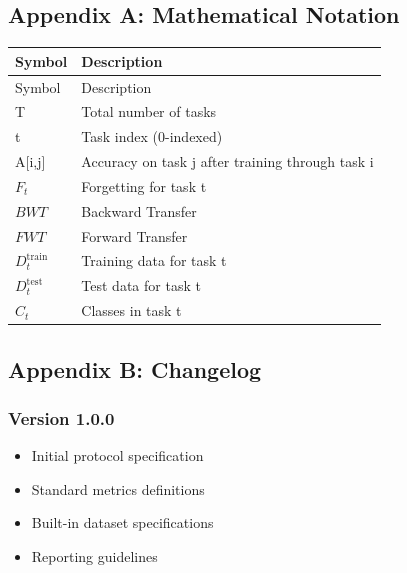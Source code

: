 \documentclass[11pt]{article}
\begin{document}
\subsection{Appendix A: Mathematical Notation}

\begin{longtable}{p{} p{}}
\toprule
Symbol & Description \\
\midrule
\endfirsthead
\toprule
Symbol & Description \\
\midrule
\endhead
T & Total number of tasks \\
t & Task index (0-indexed) \\
A[i,j] & Accuracy on task j after training through task i \\
$F_t$ & Forgetting for task t \\
$BWT$ & Backward Transfer \\
$FWT$ & Forward Transfer \\
$D_t^{\mathrm{train}}$ & Training data for task t \\
$D_t^{\mathrm{test}}$ & Test data for task t \\
$C_t$ & Classes in task t \\
\bottomrule
\end{longtable}

\subsection{Appendix B: Changelog}

\subsubsection{Version 1.0.0}

\begin{itemize}[leftmargin=*]
\item Initial protocol specification
\item Standard metrics definitions
\item Built-in dataset specifications
\item Reporting guidelines
\end{itemize}
\end{document}
